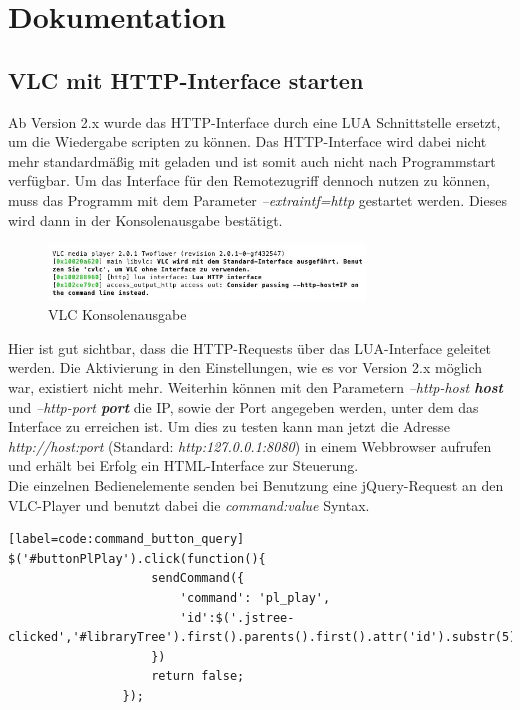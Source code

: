 \documentclass[a4paper,12pt]{article}
\begin{document}
\newpage

\section{Dokumentation}
\subsection{VLC mit HTTP-Interface starten}
Ab Version 2.x wurde das HTTP-Interface durch eine LUA Schnittstelle ersetzt, um die Wiedergabe scripten zu können. Das HTTP-Interface wird dabei nicht mehr standardmäßig mit geladen und ist somit auch nicht nach Programmstart verfügbar. Um das Interface für den Remotezugriff dennoch nutzen zu können,  muss das Programm mit dem Parameter \textit{--extraintf=http} gestartet werden. Dieses wird dann in der Konsolenausgabe bestätigt. \\
\begin{figure}[H]
\centering
\includegraphics[width=0.75\textwidth]{cli-output.jpg}
\caption{VLC Konsolenausgabe}
\end{figure}
Hier ist gut sichtbar, dass die HTTP-Requests über das LUA-Interface geleitet werden. Die Aktivierung in den Einstellungen, wie es vor Version 2.x möglich war, existiert nicht mehr. Weiterhin können mit den Parametern  \textit{--http-host \textbf{host}} und \textit{--http-port \textbf{port}} die IP, sowie der Port angegeben werden, unter dem das Interface zu erreichen ist. Um dies zu testen kann man jetzt die Adresse \textit{http://host:port} (Standard: \textit{http:127.0.0.1:8080}) in einem Webbrowser aufrufen und erhält bei Erfolg ein HTML-Interface zur Steuerung. \\
Die einzelnen Bedienelemente senden bei Benutzung eine jQuery-Request an den VLC-Player und benutzt dabei die \textit{command:value} Syntax.
\begin{lstlisting}[caption=Play Button Command][label=code:command_button_query]
$('#buttonPlPlay').click(function(){
					sendCommand({
						'command': 'pl_play',
						'id':$('.jstree-clicked','#libraryTree').first().parents().first().attr('id').substr(5)
					})
					return false;
				});
\end{lstlisting}
\end{document}

